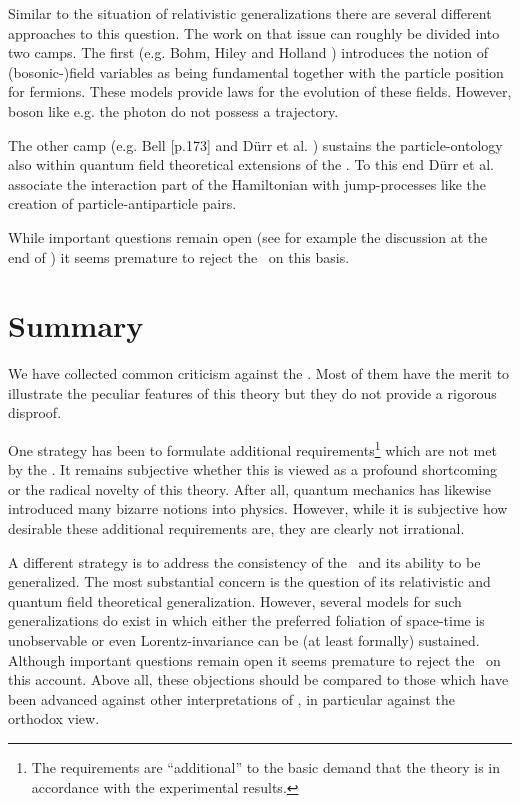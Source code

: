 Similar to the situation of relativistic generalizations there are several different approaches to this question. The work on that issue 
can roughly be divided into two camps. The first (e.g. Bohm, Hiley and Holland \cite{undivided,holland}) introduces the notion of  
(bosonic-)field variables as being fundamental together with the particle position for fermions. These models provide  
laws for the evolution of these fields. However, boson like e.g. the photon do not possess a trajectory. 

The other camp (e.g. Bell \cite{speakable}[p.173] and D\"urr et al. \cite{qft1,qft2}) sustains the particle-ontology also within quantum 
field theoretical extensions of the \dbb. To this end D\"urr et al. associate the interaction part of the Hamiltonian with
jump-processes like the creation of particle-antiparticle pairs. 

While important questions remain open (see for example the discussion at the end of \cite{qft1}) it seems 
premature to reject the \dbb\ on this basis.
\section{Summary}
We have collected common criticism against the \dbb. Most of them have the merit to 
illustrate the peculiar features of this theory but they do not provide a rigorous disproof.

One strategy has been to formulate additional requirements\footnote{The requirements are 
``additional'' to the basic demand that the theory is in accordance with the 
experimental results.} which are not met by the \dbb. It remains subjective
whether this is viewed as a profound shortcoming or the radical novelty of this 
theory. After all, quantum mechanics has likewise introduced many bizarre notions into physics. 
However, while it is subjective how desirable these additional requirements are, they are clearly not irrational. 

A different strategy is to address the consistency of the \dbb\ and its ability to be generalized. The most substantial concern is 
the question of its relativistic and quantum field theoretical generalization. However, several models for such generalizations do exist
in which either the preferred foliation of space-time is unobservable or even Lorentz-invariance can be (at least formally)
sustained. Although important questions remain open it seems premature to reject the \dbb\ on this account.
Above all, these objections should be compared to those which have been advanced against other interpretations of \qm, in particular
against the orthodox view. 


